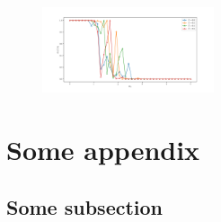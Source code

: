 \documentclass[11pt, a4paper, twocolumn]{article}
\begin{document}
\begin{figure}[H]
  \begin{center}
  \includegraphics[width=0.45\textwidth]{./media/transmission_graphene_lat_phi=0dot6Wmax=5.png}
  \caption{}
  \label{fig:transmission_graphene_lat_phi_0dot6Wmax_5.png}
  \end{center}
\end{figure}


\nocite{*}



\appendix
\section{Some appendix}
\subsection{Some subsection}
\end{document}
